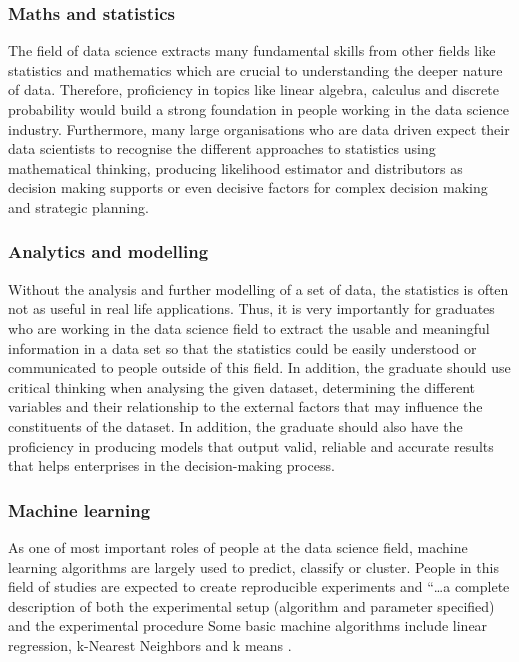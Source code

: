 \documentclass[a4paper, 11pt]{report}
\begin{document}
\subsubsection{Maths and statistics}
The field of data science extracts many fundamental skills from other fields like statistics and mathematics which are crucial to understanding the deeper nature of data. Therefore, proficiency in topics like \cite{radovilsky2018skills} linear algebra, calculus and discrete probability would build a strong foundation in people working in the data science industry. Furthermore, many large organisations who are data driven expect their data scientists to recognise the different approaches to statistics using mathematical thinking, producing likelihood estimator and distributors as decision making supports or even decisive factors \cite{cao2017data} for complex decision making and strategic planning. 

\subsubsection{Analytics and modelling}
Without the analysis and further modelling of a set of data, the statistics is often not as useful in real life applications. Thus, it is very importantly for graduates who are working in the data science field to extract the usable and meaningful information in a data set so that the statistics could be easily understood or communicated to people outside of this field. In addition, the graduate should use critical thinking when analysing the given dataset, determining the different variables and their relationship to the external factors that may influence the constituents of the dataset. In addition, the graduate should also have the proficiency in producing models that output valid, reliable and accurate results that helps enterprises in the decision-making process.

\subsubsection{Machine learning}
As one of most important roles of people at the data science field, \cite{o2013doing} machine learning algorithms are largely used to predict, classify or cluster. People in this field of studies are expected to create reproducible experiments and “…a complete description of both the experimental setup (algorithm and parameter specified) and the experimental procedure \cite{blockeel2007experiment} Some basic machine algorithms include linear regression, k-Nearest Neighbors and k means \cite{o2013doing}. 
\end{document}
